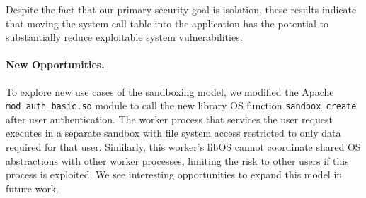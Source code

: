 



 
\begin{comment}
As Table \ref{table:vulnerabilities} illustrates almost all Linux
system call-related vulnerabilities are prevented through the \sysname{}
paradigm. These vulnerabilities are related to system calls or flags
that are blocked or restricted in \sysname{}, such as I/O control, event
polling and notification, huge pages, socket options, task stats,
\emph{etc.}  \sysname{} also restricts rarely used network protocols
such as VSOCK, TIPC and ROSE, and this prevents 41\% of network
vulnerabilities in \sysname{} systems. The Manifest file used to
restrict portions of the file system also prevented 2 FS-related
vulnerabilities. We also considered vulnerabilities in Linux
applications as preventable by \sysname{}, as all the effects are
confined in the correspondent \picoproc{} or sandbox. 
\end{comment}



Despite the fact that our primary security goal is isolation, 
these results indicate that moving the system call table into 
the application has the potential to substantially reduce exploitable 
system vulnerabilities.

\paragraph{New Opportunities.}
To explore new use cases of the \sysname{} sandboxing model, we modified the 
Apache {\tt mod\_\-auth\_\-basic.so} module to call the new library OS function
{\tt sandbox\_create} after user authentication.
The work\-er process that services the user request executes in a separate sandbox 
with file system access restricted to only data required for that user.
Similarly, this worker's libOS cannot coordinate shared OS abstractions with other worker processes,
limiting the risk to other users if this process is exploited.
We see interesting opportunities to expand this model in future work.

